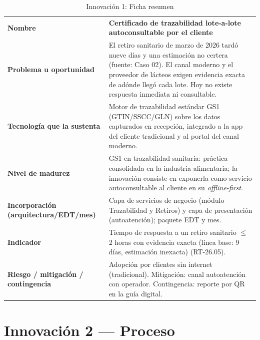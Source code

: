 \begin{table}[htbp]
\centering
\small
\caption{Innovación 1: Ficha resumen}
\label{tab:inn1}
\begin{tabularx}{\textwidth}{@{}L{5.2cm}X@{}}
\toprule
\textbf{Nombre} &
\textbf{Certificado de trazabilidad lote-a-lote autoconsultable por el cliente} \\
\addlinespace
\textbf{Problema u oportunidad} &
El retiro sanitario de marzo de 2026 tardó nueve días y una estimación no certera
(fuente: Caso 02). El canal moderno y el proveedor de lácteos exigen evidencia exacta de
adónde llegó cada lote. Hoy no existe respuesta inmediata ni consultable. \\
\addlinespace
\textbf{Tecnología que la sustenta} &
Motor de trazabilidad estándar GS1 (GTIN/SSCC/GLN) sobre los datos capturados en
recepción, integrado a la app del cliente tradicional y al portal del canal moderno. \\
\addlinespace
\textbf{Nivel de madurez} &
GS1 en trazabilidad sanitaria: práctica consolidada en la industria alimentaria; la
innovación consiste en exponerla como servicio autoconsultable al cliente en su
\emph{offline-first}. \\
\addlinespace
\textbf{Incorporación (arquitectura/EDT/mes)} &
Capa de servicios de negocio (módulo Trazabilidad y Retiros) y capa de presentación
(autoatención); \pendiente{} paquete EDT y mes. \\
\addlinespace
\textbf{Indicador} &
Tiempo de respuesta a un retiro sanitario $\leq$ 2 horas con evidencia exacta
(línea base: 9 días, estimación inexacta) (RT-26.05). \\
\addlinespace
\textbf{Riesgo / mitigación / contingencia} &
Adopción por clientes sin internet (tradicional). Mitigación: canal autoatención con
operador. Contingencia: reporte por QR en la guía digital. \\
\bottomrule
\end{tabularx}
\end{table}

\section{Innovación 2 — Proceso}

